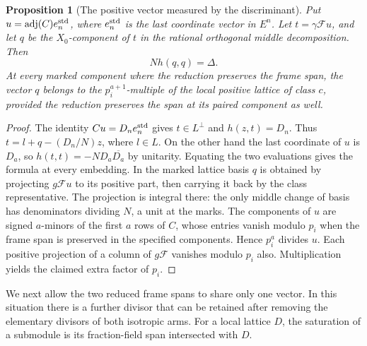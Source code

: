 \documentclass[a4paper,11pt]{article}
\newtheorem{proposition}{Proposition}[section]
\theoremstyle{definition}
\theoremstyle{remark}
\numberwithin{equation}{section}
\begin{document}
\begin{proposition}[The positive vector measured by the discriminant]
\leavevmode\label{prop:normalvector681}
Put \(u=\operatorname{adj}(C)e_n^{\rm std}\), where
\(e_n^{\rm std}\) is the last coordinate vector in \(E^n\).
Let \(t=\gamma\mathcal F u\), and let \(q\) be the \(X_0\)-component
of \(t\) in the rational orthogonal middle decomposition. Then
\[
                 N h(q,q)=\Delta .
\]
At every marked component where the reduction preserves the
frame span, the vector \(q\) belongs to the \(p_i^{a+1}\)-multiple
of the local positive lattice of class \(c\), provided the
reduction preserves the span at its paired component as well.
\end{proposition}
\begin{proof}
The identity \(Cu=D_n e_n^{\rm std}\) gives \(t\in L^\perp\)
and \(h(z,t)=D_n\). Thus \(t=l+q-(D_n/N)z\), where \(l\in L\).
On the other hand the last coordinate of \(u\) is \(D_a\),
so \(h(t,t)=-N D_a\overline{D_a}\) by unitarity. Equating the
two evaluations gives the formula at every embedding.
In the marked lattice basis \(q\) is obtained by projecting
\(g\mathcal F u\) to its positive part, then carrying it back
by the class representative. The projection is integral there:
the only middle change of basis has denominators dividing
\(N\), a unit at the marks. The components of \(u\) are signed
\(a\)-minors of the first \(a\) rows of \(C\), whose entries
vanish modulo \(p_i\) when the frame span is preserved in the
specified components. Hence \(p_i^a\) divides \(u\).
Each positive projection of a column of \(g\mathcal F\) vanishes
modulo \(p_i\) also. Multiplication yields the claimed extra
factor of \(p_i\).
\end{proof}

We next allow the two reduced frame spans to share only one
vector. In this situation there is a further divisor that can
be retained after removing the elementary divisors of both
isotropic arms. For a local lattice \(D\), the saturation of a
submodule is its fraction-field span intersected with \(D\).
\end{document}
